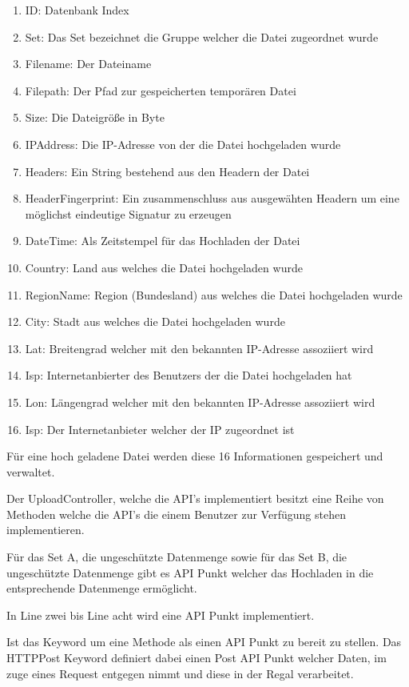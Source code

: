 \documentclass[
    fontsize=12pt,
    headings=small,
    parskip=half,           %
    bibliography=totoc,
    numbers=noenddot,       %
    open=any,               %
    ]{scrreprt}
\begin{document}
\begin{enumerate}
\item ID: Datenbank Index
\item Set: Das Set bezeichnet die Gruppe welcher die Datei zugeordnet wurde
\item Filename: Der Dateiname
\item Filepath: Der Pfad zur gespeicherten temporären Datei
\item Size: Die Dateigröße in Byte
\item IPAddress: Die IP-Adresse von der die Datei hochgeladen wurde
\item Headers: Ein String bestehend aus den Headern der Datei
\item HeaderFingerprint: Ein zusammenschluss aus ausgewähten Headern um eine möglichst eindeutige Signatur zu erzeugen
\item DateTime: Als Zeitstempel für das Hochladen der Datei
\item Country: Land aus welches die Datei hochgeladen wurde
\item RegionName: Region (Bundesland) aus welches die Datei hochgeladen wurde
\item City: Stadt aus welches die Datei hochgeladen wurde
\item Lat: Breitengrad welcher mit den bekannten IP-Adresse assoziiert wird
\item Isp: Internetanbierter des Benutzers der die Datei hochgeladen hat
\item Lon: Längengrad welcher mit den bekannten IP-Adresse assoziiert wird
\item Isp: Der Internetanbieter welcher der IP zugeordnet ist
\end{enumerate}

Für eine hoch geladene Datei werden diese 16 Informationen gespeichert und verwaltet.

Der UploadController, welche die API's implementiert besitzt eine Reihe von Methoden welche die API's die einem Benutzer zur Verfügung stehen implementieren. 

Für das Set A, die ungeschützte Datenmenge sowie für das Set B, die ungeschützte Datenmenge gibt es API Punkt welcher das Hochladen in die entsprechende Datenmenge ermöglicht. 



In Line zwei bis Line acht wird eine API Punkt implementiert. 

Ist das Keyword um eine Methode als einen API Punkt zu bereit zu stellen. Das HTTPPost Keyword definiert dabei einen Post API Punkt welcher Daten, im zuge eines Request entgegen nimmt und diese in der Regal verarbeitet. 
\end{document}
